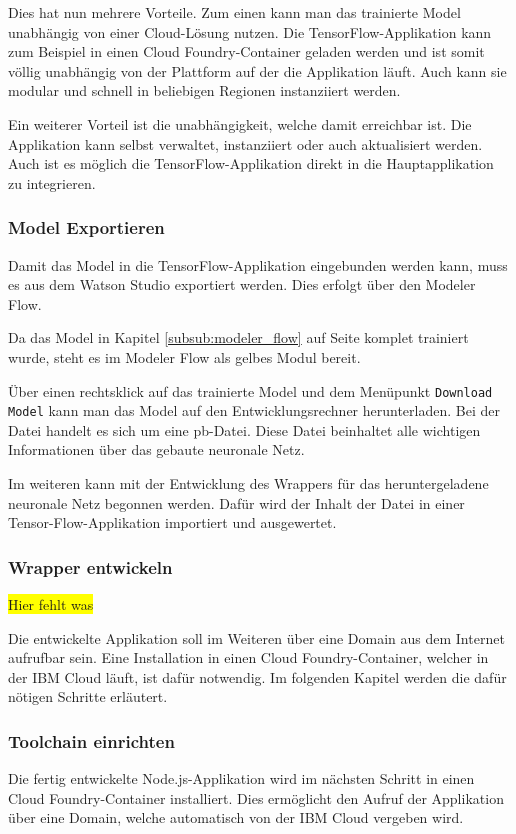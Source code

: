 Dies hat nun mehrere Vorteile. Zum einen kann man das trainierte Model unabhängig von einer Cloud-Lösung nutzen. Die
TensorFlow-Applikation kann zum Beispiel in einen Cloud Foundry-Container geladen werden und ist somit völlig unabhängig
von der Plattform auf der die Applikation läuft. Auch kann sie modular und schnell in beliebigen Regionen instanziiert
werden.

Ein weiterer Vorteil ist die unabhängigkeit, welche damit erreichbar ist. Die Applikation kann selbst verwaltet,
instanziiert oder auch aktualisiert werden. Auch ist es möglich die TensorFlow-Applikation direkt in die Hauptapplikation
zu integrieren.

\subsubsection{Model Exportieren}
Damit das Model in die TensorFlow-Applikation eingebunden werden kann, muss es aus dem Watson Studio exportiert werden.
Dies erfolgt über den Modeler Flow.

Da das Model in Kapitel \ref{subsub:modeler_flow} auf Seite \pageref{subsub:modeler_flow} komplet trainiert wurde, steht
es im Modeler Flow als gelbes Modul bereit.

Über einen rechtsklick auf das trainierte Model und dem Menüpunkt \texttt{Download Model} kann man das Model auf den
Entwicklungsrechner herunterladen. Bei der Datei handelt es sich um eine pb-Datei. Diese Datei beinhaltet alle wichtigen
Informationen über das gebaute neuronale Netz.

Im weiteren kann mit der Entwicklung des Wrappers für das heruntergeladene neuronale Netz begonnen werden. Dafür wird
der Inhalt der Datei in einer Tensor-Flow-Applikation importiert und ausgewertet.

\subsubsection{Wrapper entwickeln}
\colorbox{yellow}{Hier fehlt was}

Die entwickelte Applikation soll im Weiteren über eine Domain aus dem Internet aufrufbar sein. Eine Installation in einen
Cloud Foundry-Container, welcher in der IBM Cloud läuft, ist dafür notwendig. Im folgenden Kapitel werden die dafür
nötigen Schritte erläutert.

\subsubsection{Toolchain einrichten}
Die fertig entwickelte Node.js-Applikation wird im nächsten Schritt in einen Cloud Foundry-Container installiert. Dies
ermöglicht den Aufruf der Applikation über eine Domain, welche automatisch von der IBM Cloud vergeben wird.

